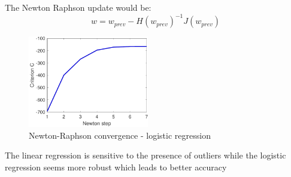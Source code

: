 \documentclass{acmsiggraph}
\begin{document}
The Newton Raphson update would be:
\[w = w_{prev} - H(w_{prev})^{-1}J(w_{prev})\]
\begin{figure}[H]
\centering
\includegraphics[height=4cm]{newton_logit}
\caption*{Newton-Raphson convergence - logistic regression}
\end{figure}
The linear regression is sensitive to the presence of outliers while the logistic regression seems more robust which leads to better accuracy
\begin{figure}[H]
\centering
{}
\hspace{5pt}
\end{figure}
\end{document}
